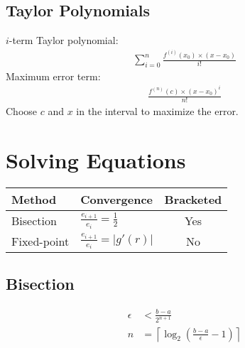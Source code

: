 \documentclass[12pt]{article}
\newcommand{\round}   [1]{\left(       #1 \right)}
\newcommand{\straight}[1]{\left|       #1 \right|}
\newcommand{\ceiling} [1]{\left\lceil  #1 \right\rceil}
\begin{document}
\subsection*{Taylor Polynomials}
$i$-term Taylor polynomial:
\begin{align*}
    \sum_{i=0}^n \frac{f^{(i)}(x_0) \times (x - x_0)}{i!}
\end{align*}
Maximum error term:
\begin{align*}
    \frac{f^{(n)}(c) \times (x - x_0)^i}{n!}
\end{align*}
Choose $c$ and $x$ in the interval to maximize the error.

\section*{Solving Equations}

\begin{center}
    \begin{tabular}{l|lc}
        Method & Convergence & Bracketed \\ \hline
        Bisection & $\frac{e_{i+1}}{e_i} = \frac{1}{2}$ & Yes \\
        Fixed-point & $\frac{e_{i+1}}{e_i} = \straight{g'(r)}$ & No
    \end{tabular}
\end{center}

\subsection*{Bisection}
\begin{align*}
    \epsilon &< \frac{b - a}{2^{n + 1}} \\
    n &= \ceiling{\log_2 \round{\frac{b - a}{\epsilon} - 1}}
\end{align*}
\end{document}
